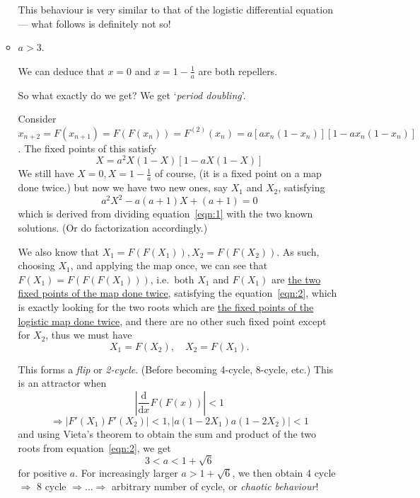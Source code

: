 \documentclass[12pt]{report}
\theoremstyle{definition}
\begin{document}
\begin{ex}
\begin{enumerate}[label = (\alph*)]
\begin{itemize}
            This behaviour is very similar to that of the logistic differential equation
            --- what follows is definitely not so!

        \item $a > 3$.

            We can deduce that $x = 0$ and $x = 1 - \frac{1}{a}$ are both repellers.

            So what exactly do we get?
            We get `\emph{period doubling}'.

            \medskip
            Consider $x_{n + 2} = F(x_{n + 1}) = F(F(x_{n})) = F^{(2)}(x_n)
            = a[ax_n (1 - x_n)][1 - ax_n(1 - x_n)]$.
            The fixed points of this satisfy
            \begin{equation}\label{eqn:1}
                X = a^{2}X(1 - X)[1 - aX(1-X)]
            \end{equation}
            We still have $X = 0, X = 1 - \frac{1}{a}$ of course,
            (it is a fixed point on a map done twice.)
            but now we have two new ones, say $X_1$ and $X_2$, satisfying
            \begin{equation}\label{eqn:2}
                a^{2}X^{2} - a(a+1)X + (a+1) = 0
            \end{equation}
            which is derived from dividing equation~\eqref{eqn:1} with the two known solutions.
            (Or do factorization accordingly.) 

            \medskip
            We also know that $X_1 = F(F(X_1)), X_2 = F(F(X_2))$.
            As such, choosing $X_1$, and applying the map once, we can see that $F(X_1) = F(F(F(X_1)))$,
            i.e.\ both $X_1$ and $F(X_1)$ are 
            \ul{the two fixed points of the map done twice},
            satisfying the equation~\eqref{eqn:2}, which is exactly looking for the two roots which are
            \ul{the fixed points of the logistic map done twice},
            and there are no other such fixed point except for $X_2$,
            thus we must have\[
                X_1 = F(X_2), \quad X_2 = F(X_1).
            \]

            This forms a \emph{flip} or \emph{2-cycle}. (Before becoming 4-cycle, 8-cycle, etc.)
            This is an attractor when\[
                \left|\frac{\mathrm{d}}{\mathrm{d}x} F(F(x)) \right| < 1
            \]\[
                \Rightarrow{} |F'(X_1)F'(X_2)| < 1,
                |a(1 - 2X_1) a(1 - 2X_2)| < 1
            \]and using Vieta's theorem to obtain the sum and product of the two roots
            from equation~\eqref{eqn:2}, we get\[
                3 < a < 1 + \sqrt{6}
            \]
            for positive $a$. For increasingly larger $a > 1 + \sqrt{6}$, we then obtain 4 cycle
            $\Rightarrow{}$ 8 cycle $\Rightarrow{} \ldots \Rightarrow{}$
            arbitrary number of cycle, or \emph{chaotic behaviour}!
    \end{itemize}
    \end{enumerate}
    
\end{ex}
\end{document}
